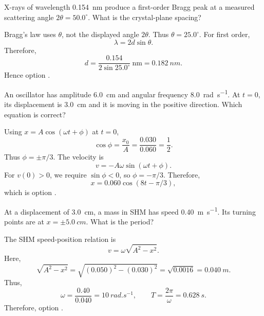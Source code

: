 \begin{quizquestion}[
  id=phy104-opt-040,
  topic=optics,
  difficulty=applied,
  marks=2,
  correct=E,
  tags={bragg-law,x-ray-diffraction,plane-spacing},
  outcome={Use Bragg's law to determine crystal-plane spacing}
]
  X-rays of wavelength \SI{0.154}{nm} produce a first-order Bragg peak at a measured scattering angle \(2\theta=50.0^\circ\). What is the crystal-plane spacing?
\end{quizquestion}
\begin{quizsolution}
  Bragg's law uses \(\theta\), not the displayed angle \(2\theta\). Thus \(\theta=25.0^\circ\). For first order,
    \[
      \lambda=2d\sin\theta.
    \]
    Therefore,
    \[
      d=\frac{0.154}{2\sin25.0^\circ}\ \mathrm{nm}
      =\SI{0.182}{nm}.
    \]
    Hence option \textbf{\quizcorrectletter}.
\end{quizsolution}

\begin{quizquestion}[
  id=phy104-osc-041,
  topic=oscillations,
  difficulty=challenge,
  marks=3,
  correct=C,
  tags={shm,initial-conditions,phase-direction},
  outcome={Construct an SHM equation from displacement and direction}
]
  An oscillator has amplitude \SI{6.0}{cm} and angular frequency \SI{8.0}{rad.s^{-1}}. At \(t=0\), its displacement is \SI{3.0}{cm} and it is moving in the positive direction. Which equation is correct?
\end{quizquestion}
\begin{quizsolution}
  Using \(x=A\cos(\omega t+\phi)\) at \(t=0\),
    \[
      \cos\phi=\frac{x_0}{A}=\frac{0.030}{0.060}=\frac12.
    \]
    Thus \(\phi=\pm\pi/3\). The velocity is
    \[
      v=-A\omega\sin(\omega t+\phi).
    \]
    For \(v(0)>0\), we require \(\sin\phi<0\), so \(\phi=-\pi/3\). Therefore,
    \[
      x=0.060\cos(8t-\pi/3),
    \]
    which is option \textbf{\quizcorrectletter}.
\end{quizsolution}

\begin{quizquestion}[
  id=phy104-osc-042,
  topic=oscillations,
  difficulty=challenge,
  marks=3,
  correct=B,
  tags={shm,energy,period},
  outcome={Determine an SHM period from displacement and speed}
]
  At a displacement of \SI{3.0}{cm}, a mass in SHM has speed \SI{0.40}{m.s^{-1}}. Its turning points are at \(x=\pm\SI{5.0}{cm}\). What is the period?
\end{quizquestion}
\begin{quizsolution}
  The SHM speed-position relation is
    \[
      v=\omega\sqrt{A^2-x^2}.
    \]
    Here,
    \[
      \sqrt{A^2-x^2}=\sqrt{{(0.050)}^2-{(0.030)}^2}
      =\sqrt{0.0016}=\SI{0.040}{m}.
    \]
    Thus,
    \[
      \omega=\frac{0.40}{0.040}=\SI{10}{rad.s^{-1}},
      \qquad
      T=\frac{2\pi}{\omega}=\SI{0.628}{s}.
    \]
    Therefore, option \textbf{\quizcorrectletter}.
\end{quizsolution}

